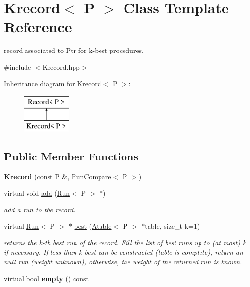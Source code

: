 \hypertarget{classKrecord}{}\section{Krecord$<$ P $>$ Class Template Reference}
\label{classKrecord}


record associated to Ptr for k-\/best procedures.  




{\ttfamily \#include $<$Krecord.\+hpp$>$}

Inheritance diagram for Krecord$<$ P $>$\+:\begin{figure}[H]
\begin{center}
\leavevmode
\includegraphics[height=2.000000cm]{classKrecord}
\end{center}
\end{figure}
\subsection*{Public Member Functions}
\begin{DoxyCompactItemize}
\item 
\mbox{\label{classKrecord_af92867687943d0f45b4f27d925127393}} 
{\bfseries Krecord} (const P \&, Run\+Compare$<$ P $>$)
\item 
\mbox{\label{classKrecord_a7f19d5761c5dd197b845bdd8a2d3bd2a}} 
virtual void \mbox{\hyperlink{classKrecord_a7f19d5761c5dd197b845bdd8a2d3bd2a}{add}} (\mbox{\hyperlink{classRun}{Run}}$<$ P $>$ $\ast$)
\begin{DoxyCompactList}\small\item\em add a run to the record. \end{DoxyCompactList}\item 
\mbox{\label{classKrecord_a3969af28b4979e3647c149e9f35f21b7}} 
virtual \mbox{\hyperlink{classRun}{Run}}$<$ P $>$ $\ast$ \mbox{\hyperlink{classKrecord_a3969af28b4979e3647c149e9f35f21b7}{best}} (\mbox{\hyperlink{classAtable}{Atable}}$<$ P $>$ $\ast$table, size\+\_\+t k=1)
\begin{DoxyCompactList}\small\item\em returns the k-\/th best run of the record. Fill the list of best runs up to (at most) k if necessary. If less than k best can be constructed (table is complete), return an null run (weight unknown), otherwise, the weight of the returned run is known. \end{DoxyCompactList}\item 
\mbox{\label{classKrecord_a2f4146eec2a91b889e1118a30af978ca}} 
virtual bool {\bfseries empty} () const
\end{DoxyCompactItemize}
